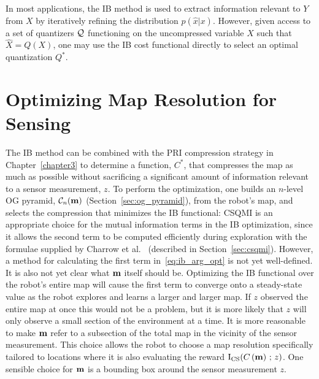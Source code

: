 In most applications, the IB method is used to extract information relevant to $Y$ from $X$ by
iteratively refining the distribution $p(\hat{x} \vert x)$. However, given
access to a set of quantizers $\mathcal{Q}$ functioning on the uncompressed variable
$X$ such that $\hat{X} = Q(X)$, one may use the IB cost functional directly to select an optimal
quantization $Q^{*}$.
%
%

\section{Optimizing Map Resolution for Sensing}
\label{sec:ib_spec}

The IB method can be combined with the PRI compression strategy in
Chapter~\ref{chapter3} to determine a function, $C^{*}$, that compresses the map
as much as possible without sacrificing a significant amount of information relevant
to a sensor measurement,
$z$. To perform the optimization, one builds an $n$-level OG pyramid,
$\mathcal{C}_{n}(\mathbf{m})$ (Section~\ref{sec:og_pyramid}), from the robot's map, and selects the compression that
minimizes the IB functional:
%
%
CSQMI is an appropriate choice for the mutual information terms in the IB
optimization, since it allows
the second term to be computed efficiently during
exploration with the formulae supplied by Charrow et
al.~\cite{charrow2015icra} (described in Section~\ref{sec:csqmi}). However, a
method for calculating the first term in~\eqref{eq:ib_arg_opt} is not yet well-defined.
It is also not yet clear what $\mathbf{m}$ itself should be. Optimizing the IB functional
over the robot's entire map will cause the first term to converge onto a steady-state value
as the robot explores and learns a larger and larger map. If $z$ observed the entire map at
once this would not be a problem, but it is more likely that $z$ will only observe a small
section of the environment at a time. It is more reasonable to make $\mathbf{m}$
refer to a subsection of the total map in the vicinity of the sensor measurement. This choice
allows the robot to choose a map resolution specifically tailored to locations where it is also evaluating
the reward $\text{I}_{\text{CS}}(C\left(\mathbf{m}\right)\, ;\, z)$. One sensible
choice for $\mathbf{m}$ is a bounding box around the sensor measurement $z$.

